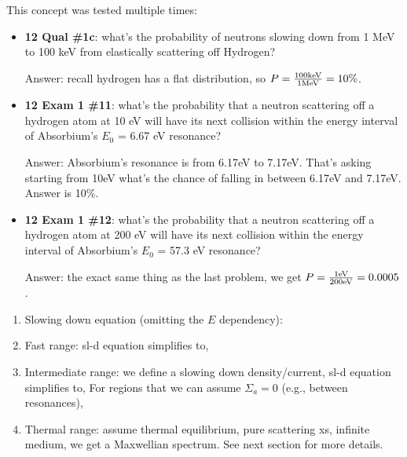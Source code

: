 \documentclass{school-22.211-notes}
\begin{document}
\begin{enumerate}
  This concept was tested multiple times:
  \begin{itemize}
    \item  \textbf{12 Qual \#1c}: what's the probability of neutrons slowing down from 1 MeV to 100 keV from elastically scattering off Hydrogen? 

      Answer: recall hydrogen has a flat distribution, so $P = \frac{100 \mathrm{keV}}{1 \mathrm{MeV}} = 10\%$. 
    \item \textbf{12 Exam 1 \#11}: what's the probability that a neutron scattering off a hydrogen atom at 10 eV will have its next collision within the energy interval of Absorbium's $E_0$ = 6.67 eV resonance? 

      Answer: Absorbium's resonance is from 6.17eV to 7.17eV. That's asking starting from 10eV what's the chance of falling in between 6.17eV and 7.17eV. Answer is 10\%. 

    \item \textbf{12 Exam 1 \#12}: what's the probability that a neutron scattering off a hydrogen atom at 200 eV will have its next collision within the energy interval of Absorbium's $E_0$ = 57.3 eV resonance? 

      Answer: the exact same thing as the last problem, we get $P = \frac{1 \mathrm{eV}}{200 \mathrm{eV}} = 0.0005$. 
  \end{itemize}

\end{enumerate}


\clearpage
{} 
\begin{enumerate}
\item Slowing down equation (omitting the $E$ dependency): 
  
\item Fast range: sl-d equation simplifies to, 
  
\item Intermediate range: we define a slowing down density/current, 
  sl-d equation simplifies to, 
  For regions that we can assume $\Sigma_a = 0$ (e.g., between resonances), 

\item Thermal range: assume thermal equilibrium, pure scattering xs, infinite medium, we get a Maxwellian spectrum. See next section for more details.
\end{enumerate}
\end{document}
